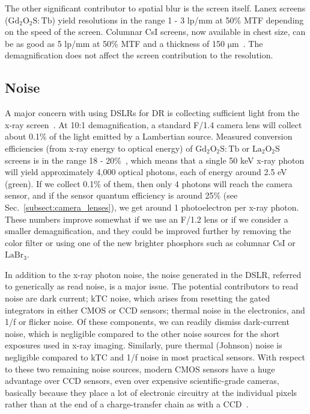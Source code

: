The other significant contributor to spatial blur is the screen itself. Lanex screens ($\mathrm{Gd_2O_2S:Tb}$) yield resolutions in the range 1 - 3 lp/mm at 50\% MTF depending on the speed of the screen. Columnar CsI screens, now available in chest size, can be as good as 5 lp/mm at 50\% MTF and a thickness of 150 $\mathrm{\mu m}$~\citep{Nagarkar1997}. The demagnification does not affect the screen contribution to the resolution.

\subsection{Noise}
\label{subsect:noise}
A major concern with using DSLRs for DR is collecting sufficient light from the x-ray screen~\citep{Hejazi1997}. At 10:1 demagnification, a standard F/1.4 camera lens will collect about 0.1\% of the light emitted by a Lambertian source. Measured conversion efficiencies (from x-ray energy to optical energy) of $\mathrm{Gd_2O_2S:Tb}$ or $\mathrm{La_2O_2S}$ screens is in the range 18 - 20\%~\citep{Kandarakis2001}, which means that a single 50 keV x-ray photon will yield approximately 4,000 optical photons, each of energy around 2.5 eV (green). If we collect 0.1\% of them, then only 4 photons will reach the camera sensor, and if the sensor quantum efficiency is around 25\% (see Sec.~\ref{subsect:camera_lenses}), we get around 1 photoelectron per x-ray photon. These numbers improve somewhat if we use an F/1.2 lens or if we consider a smaller demagnification, and they could be improved further by removing the color filter or using one of the new brighter phosphors such as columnar CsI or $\mathrm{LaBr_3}$.

In addition to the x-ray photon noise, the noise generated in the DSLR, referred to generically as read noise, is a major issue. The potential contributors to read noise are dark current; kTC noise, which arises from resetting the gated integrators in either CMOS or CCD sensors; thermal noise in the electronics, and 1/f or flicker noise. Of these components, we can readily dismiss dark-current noise, which is negligible compared to the other noise sources for the short exposures used in x-ray imaging. Similarly, pure thermal (Johnson) noise is negligible compared to kTC and 1/f noise in most practical sensors. With respect to these two remaining noise sources, modern CMOS sensors have a huge advantage over CCD sensors, even over expensive scientific-grade cameras, basically because they place a lot of electronic circuitry at the individual pixels rather than at the end of a charge-transfer chain as with a CCD~\citep{Magnan2003}.

